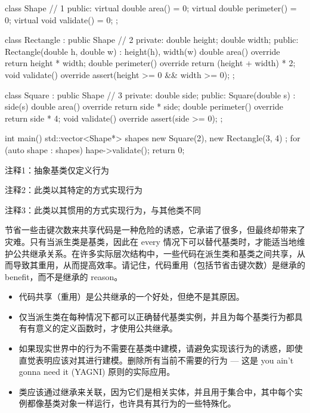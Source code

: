 \begin{cpp}
class Shape { // 1
public:
  virtual double area() = 0;
  virtual double perimeter() = 0;
  virtual void validate() = 0;
};

class Rectangle : public Shape { // 2
private:
  double height;
  double width;
public:
  Rectangle(double h, double w) : height(h), width(w) {}
  double area() override { return height * width; }
  double perimeter() override { return (height + width) * 2; }
  void validate() override { assert(height >= 0 && width >= 0); }
};

class Square : public Shape { // 3
private:
  double side;
public:
  Square(double s) : side(s) {}
  double area() override { return side * side; }
  double perimeter() override { return side * 4; }
  void validate() override { assert(side >= 0); }
};

int main() {
  std::vector<Shape*> shapes { new Square(2), new Rectangle(3, 4) };
  for (auto shape : shapes)
    hape->validate();
  return 0;
}
\end{cpp}

{\footnotesize
注释1：抽象基类仅定义行为

注释2：此类以其特定的方式实现行为

注释3：此类以其惯用的方式实现行为，与其他类不同
}

节省一些击键次数来共享代码是一种危险的诱惑，它承诺了很多，但最终却带来了灾难。只有当派生类是基类，因此在 every 情况下可以替代基类时，才能适当地维护公共继承关系。在许多实际层次结构中，一些代码在派生类和基类之间共享，从而导致其重用，从而提高效率。请记住，代码重用（包括节省击键次数）是继承的 benefit，而不是继承的 reason。


\begin{itemize}
\item
代码共享（重用）是公共继承的一个好处，但绝不是其原因。

\item
仅当派生类在每种情况下都可以正确替代基类实例，并且为每个基类行为都具有有意义的定义函数时，才使用公共继承。

\item
如果现实世界中的行为不需要在基类中建模，请避免实现该行为的诱惑，即使直觉表明应该对其进行建模。删除所有当前不需要的行为 — 这是 you ain’t gonna need it (YAGNI) 原则的实际应用。

\item
类应该通过继承来关联，因为它们是相关实体，并且用于集合中，其中每个实例都像基类对象一样运行，也许具有其行为的一些特殊化。
\end{itemize}












